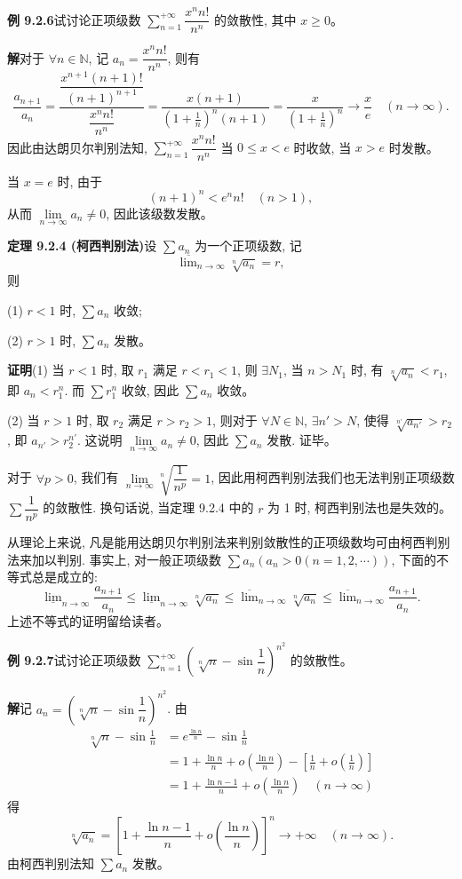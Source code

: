 \documentclass[UTF8, 12pt, fontset=fandol, oneside]{ctexart}
\begin{document}
\noindent\textbf{例 9.2.6}\quad 试讨论正项级数 $\sum\limits_{n=1}^{+\infty}\dfrac{x^n n!}{n^n}$ 的敛散性, 其中 $x\geq0$。

\noindent\textbf{解}\quad 对于 $\forall n\in\mathbb{N}$, 记 $a_n=\dfrac{x^n n!}{n^n}$, 则有
\[
  \frac{a_{n+1}}{a_n}
  =\frac{\dfrac{x^{n+1}(n+1)!}{(n+1)^{n+1}}}{\dfrac{x^n n!}{n^n}}
  =\frac{x(n+1)}{\left(1+\frac1n\right)^n(n+1)}
  =\frac{x}{\left(1+\frac1n\right)^n}\to\frac{x}{e}\quad(n\to\infty).
\]
因此由达朗贝尔判别法知, $\sum\limits_{n=1}^{+\infty}\dfrac{x^n n!}{n^n}$ 当 $0\leq x<e$ 时收敛, 当 $x>e$ 时发散。

当 $x=e$ 时, 由于
\[
  (n+1)^n<e^n n!\quad(n>1),
\]
从而 $\lim\limits_{n\to\infty}a_n\neq0$, 因此该级数发散。

\noindent\textbf{定理 9.2.4 (柯西判别法)}\quad 设 $\sum a_n$ 为一个正项级数, 记
\[
  \overline{\lim}_{n\to\infty}\sqrt[n]{a_n}=r,
\]
则

(1) $r<1$ 时, $\sum a_n$ 收敛;

(2) $r>1$ 时, $\sum a_n$ 发散。

\noindent\textbf{证明}\quad (1) 当 $r<1$ 时, 取 $r_1$ 满足 $r<r_1<1$, 则 $\exists N_1$, 当 $n>N_1$ 时, 有 $\sqrt[n]{a_n}<r_1$, 即 $a_n<r_1^n$. 而 $\sum r_1^n$ 收敛, 因此 $\sum a_n$ 收敛。

(2) 当 $r>1$ 时, 取 $r_2$ 满足 $r>r_2>1$, 则对于 $\forall N\in\mathbb{N}$, $\exists n'>N$, 使得 $\sqrt[n']{a_{n'}}>r_2$, 即 $a_{n'}>r_2^{n'}$. 这说明 $\lim\limits_{n\to\infty}a_n\neq0$, 因此 $\sum a_n$ 发散. 证毕。

对于 $\forall p>0$, 我们有 $\lim\limits_{n\to\infty}\sqrt[n]{\dfrac1{n^p}}=1$, 因此用柯西判别法我们也无法判别正项级数 $\sum\dfrac1{n^p}$ 的敛散性. 换句话说, 当定理 9.2.4 中的 $r$ 为 1 时, 柯西判别法也是失效的。

从理论上来说, 凡是能用达朗贝尔判别法来判别敛散性的正项级数均可由柯西判别法来加以判别. 事实上, 对一般正项级数 $\sum a_n(a_n>0(n=1,2,\cdots))$, 下面的不等式总是成立的:
\[
  \underline{\lim}_{n\to\infty}\frac{a_{n+1}}{a_n}
  \leq \underline{\lim}_{n\to\infty}\sqrt[n]{a_n}
  \leq \overline{\lim}_{n\to\infty}\sqrt[n]{a_n}
  \leq \overline{\lim}_{n\to\infty}\frac{a_{n+1}}{a_n}.
\]
上述不等式的证明留给读者。

\noindent\textbf{例 9.2.7}\quad 试讨论正项级数 $\sum\limits_{n=1}^{+\infty}\left(\sqrt[n]{n}-\sin\dfrac1n\right)^{n^2}$ 的敛散性。

\noindent\textbf{解}\quad 记 $a_n=\left(\sqrt[n]{n}-\sin\dfrac1n\right)^{n^2}$. 由
\[
\begin{aligned}
  \sqrt[n]{n}-\sin\frac1n
  &=e^{\frac{\ln n}{n}}-\sin\frac1n\\
  &=1+\frac{\ln n}{n}+o\left(\frac{\ln n}{n}\right)-\left[\frac1n+o\left(\frac1n\right)\right]\\
  &=1+\frac{\ln n-1}{n}+o\left(\frac{\ln n}{n}\right)\quad(n\to\infty)
\end{aligned}
\]
得
\[
  \sqrt[n]{a_n}=\left[1+\frac{\ln n-1}{n}+o\left(\frac{\ln n}{n}\right)\right]^n\to+\infty\quad(n\to\infty).
\]
由柯西判别法知 $\sum a_n$ 发散。
\end{document}
